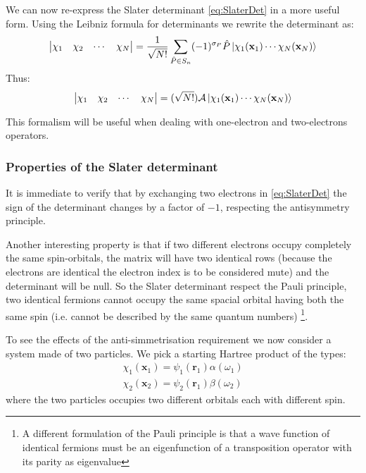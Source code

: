 \documentclass[a4paper,12pt]{article}
\begin{document}
We can now re-express the Slater determinant \eqref{eq:SlaterDet} in a more useful form. Using the Leibniz formula for determinants we rewrite the determinant as:
\begin{equation}\label{eq:SlaterLeibniz}
	\left|
	\begin{matrix}
		   \chi _1 & \chi _2 & \cdots  & \chi _N  \\
	\end{matrix} 
	\right| = \frac{1}{\sqrt{N!}} \sum_{\hat{P} \in S_n} (-1)^{\sigma_P} \hat{P} \ket{\chi_1(\mathbf{x}_1) \cdots   \chi_N(\mathbf{x}_N)}
\end{equation}
Thus:
\begin{equation}
	\left|
	\begin{matrix}
		   \chi _1 & \chi _2 & \cdots  & \chi _N  \\
	\end{matrix} 
	\right| =  (\sqrt{N!}) \mathcal{A} \ket{ \chi_1(\mathbf{x}_1) \cdots   \chi_N(\mathbf{x}_N) }
\end{equation}

This formalism will be useful when dealing with one-electron and two-electrons operators.

\subsubsection{Properties of the Slater determinant}\label{sec:slaterPropr}

It is immediate to verify that by exchanging two electrons in \eqref{eq:SlaterDet} the sign of the determinant changes by a factor of $- 1$, respecting the antisymmetry principle.

Another interesting property is that if two different electrons occupy completely the same spin-orbitals, the matrix will have two identical rows (because the electrons are identical the electron index is to be considered mute) and the determinant will be null. So the Slater determinant respect the Pauli principle, two identical fermions cannot occupy the same spacial orbital having both the same spin (i.e. cannot be described by the same quantum numbers) \footnote{A different formulation of the Pauli principle is that a wave function of identical fermions must be an eigenfunction of a transposition operator with its parity as eigenvalue}.


To see the effects of the anti-simmetrisation requirement we now consider a system made of two particles. We pick a starting Hartree product of the types: 
\begin{align*}
	\chi_{1}(\mathbf{x}_{1}) = \psi_{1}(\mathbf{r}_{1}) \alpha(\omega_{1})\\
	\chi_{2}(\mathbf{x}_{2}) = \psi_{2}(\mathbf{r}_{1}) \beta(\omega_{2})
\end{align*}
where the two particles occupies two different orbitals each with different spin.
\end{document}

